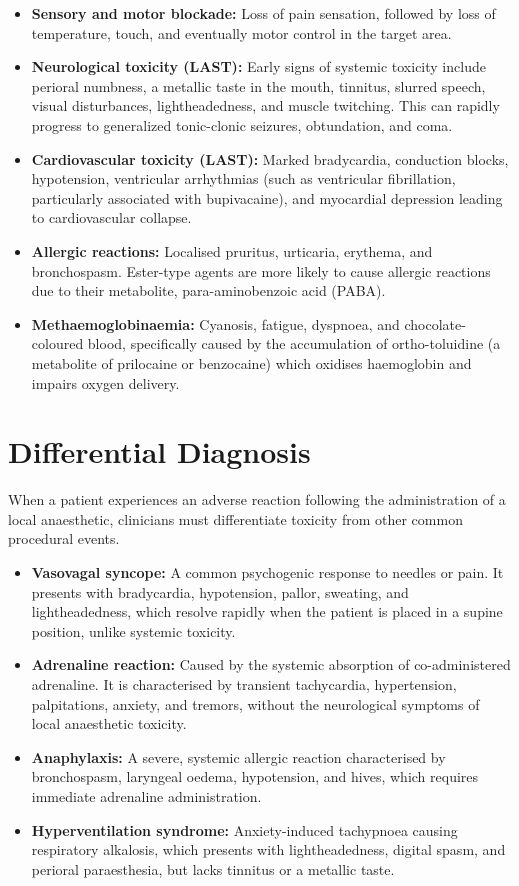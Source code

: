 \begin{itemize}
    \item \textbf{Sensory and motor blockade:} Loss of pain sensation, followed by loss of temperature, touch, and eventually motor control in the target area.
    \item \textbf{Neurological toxicity (LAST):} Early signs of systemic toxicity include perioral numbness, a metallic taste in the mouth, tinnitus, slurred speech, visual disturbances, lightheadedness, and muscle twitching. This can rapidly progress to generalized tonic-clonic seizures, obtundation, and coma.
    \item \textbf{Cardiovascular toxicity (LAST):} Marked bradycardia, conduction blocks, hypotension, ventricular arrhythmias (such as ventricular fibrillation, particularly associated with bupivacaine), and myocardial depression leading to cardiovascular collapse.
    \item \textbf{Allergic reactions:} Localised pruritus, urticaria, erythema, and bronchospasm. Ester-type agents are more likely to cause allergic reactions due to their metabolite, para-aminobenzoic acid (PABA).
    \item \textbf{Methaemoglobinaemia:} Cyanosis, fatigue, dyspnoea, and chocolate-coloured blood, specifically caused by the accumulation of ortho-toluidine (a metabolite of prilocaine or benzocaine) which oxidises haemoglobin and impairs oxygen delivery.
\end{itemize}

\section*{Differential Diagnosis}
When a patient experiences an adverse reaction following the administration of a local anaesthetic, clinicians must differentiate toxicity from other common procedural events.

\begin{itemize}
    \item \textbf{Vasovagal syncope:} A common psychogenic response to needles or pain. It presents with bradycardia, hypotension, pallor, sweating, and lightheadedness, which resolve rapidly when the patient is placed in a supine position, unlike systemic toxicity.
    \item \textbf{Adrenaline reaction:} Caused by the systemic absorption of co-administered adrenaline. It is characterised by transient tachycardia, hypertension, palpitations, anxiety, and tremors, without the neurological symptoms of local anaesthetic toxicity.
    \item \textbf{Anaphylaxis:} A severe, systemic allergic reaction characterised by bronchospasm, laryngeal oedema, hypotension, and hives, which requires immediate adrenaline administration.
    \item \textbf{Hyperventilation syndrome:} Anxiety-induced tachypnoea causing respiratory alkalosis, which presents with lightheadedness, digital spasm, and perioral paraesthesia, but lacks tinnitus or a metallic taste.
\end{itemize}

